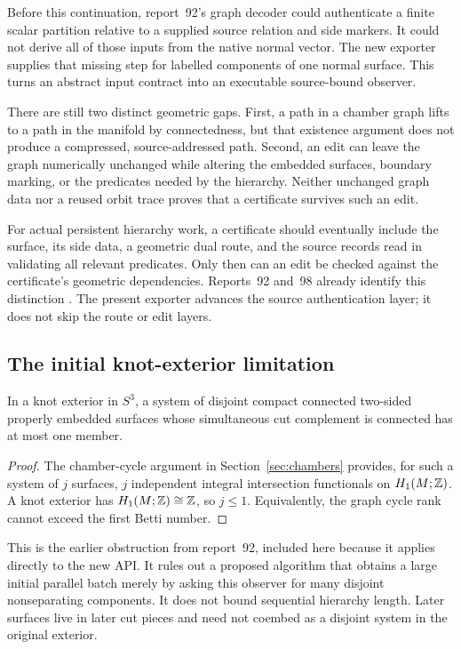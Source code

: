 Before this continuation, report~92's graph decoder could authenticate a
finite scalar partition relative to a supplied source relation and side
markers. It could not derive all of those inputs from the native normal
vector. The new exporter supplies that missing step for labelled components
of one normal surface. This turns an abstract input contract into an
executable source-bound observer.

There are still two distinct geometric gaps. First, a path in a chamber
graph lifts to a path in the manifold by connectedness, but that existence
argument does not produce a compressed, source-addressed path. Second, an
edit can leave the graph numerically unchanged while altering the embedded
surfaces, boundary marking, or the predicates needed by the hierarchy.
Neither unchanged graph data nor a reused orbit trace proves that a
certificate survives such an edit.

For actual persistent hierarchy work, a certificate should eventually
include the surface, its side data, a geometric dual route, and the
source records read in validating all relevant predicates. Only then can
an edit be checked against the certificate's geometric dependencies.
Reports~92 and~98 already identify this distinction
\cite{persistence,gauge}. The present exporter advances the source
authentication layer; it does not skip the route or edit layers.

\subsection{The initial knot-exterior limitation}

\begin{proposition}
\label{prop:rank-one}
In a knot exterior in \(S^3\), a system of disjoint compact connected
two-sided properly embedded surfaces whose simultaneous cut complement
is connected has at most one member.
\end{proposition}
\begin{proof}
The chamber-cycle argument in Section~\ref{sec:chambers} provides, for
such a system of \(j\) surfaces, \(j\) independent integral intersection
functionals on \(H_1(M;\mathbb Z)\). A knot exterior has
\(H_1(M;\mathbb Z)\cong\mathbb Z\), so \(j\le1\). Equivalently, the graph cycle rank
cannot exceed the first Betti number.
\end{proof}

This is the earlier obstruction from report~92, included here because it
applies directly to the new API. It rules out a proposed algorithm that
obtains a large initial parallel batch merely by asking this observer for
many disjoint nonseparating components. It does not bound sequential
hierarchy length. Later surfaces live in later cut pieces and need not
coembed as a disjoint system in the original exterior.

